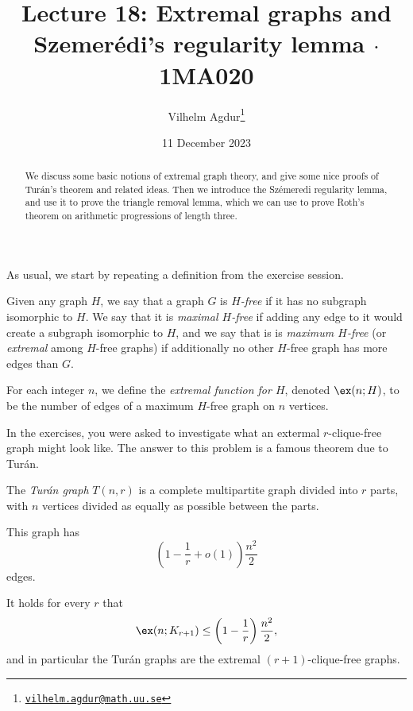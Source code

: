 \documentclass[nobib]{tufte-handout}
\title{Lecture 18: Extremal graphs and Szemerédi's regularity lemma $\cdot$ 1MA020}
\author[Vilhelm Agdur]{Vilhelm Agdur\thanks{\href{mailto:vilhelm.agdur@math.uu.se}{\nolinkurl{vilhelm.agdur@math.uu.se}}}}
\date{11 December 2023}
\begin{document}
\maketitle%

\begin{abstract}
\noindent
We discuss some basic notions of extremal graph theory, and give some nice proofs of Turán's theorem and related ideas. Then we introduce the Szémeredi regularity lemma, and use it to prove the triangle removal lemma, which we can use to prove Roth's theorem on arithmetic progressions of length three.
\end{abstract}

As usual, we start by repeating a definition from the exercise session.

\begin{definition}
    Given any graph $H$, we say that a graph $G$ is \emph{$H$-free} if it has no subgraph isomorphic to $H$. We say that it is \emph{maximal $H$-free} if adding any edge to it would create a subgraph isomorphic to $H$, and we say that is is \emph{maximum $H$-free} (or \emph{extremal} among $H$-free graphs) if additionally no other $H$-free graph has more edges than $G$.
  
    For each integer $n$, we define the \emph{extremal function for $H$}, denoted $\ex(n; H)$, to be the number of edges of a maximum $H$-free graph on $n$ vertices.
\end{definition}

In the exercises, you were asked to investigate what an extermal $r$-clique-free graph might look like. The answer to this problem is a famous theorem due to Turán.

\begin{definition}
    The \emph{Turán graph} $T(n,r)$ is a complete multipartite graph divided into $r$ parts, with $n$ vertices divided as equally as possible between the parts.

    This graph has
    $$\left(1 - \frac{1}{r} + o(1)\right)\frac{n^2}{2}$$
    edges.
\end{definition}

\begin{theorem}[Turán, 1941]\label{thm:turan}
    It holds for every $r$ that
    $$\ex(n; K_{r+1}) \leq \left(1 - \frac{1}{r}\right)\frac{n^2}{2},$$
    and in particular the Turán graphs are the extremal $(r+1)$-clique-free graphs.
\end{theorem}
\end{document}
